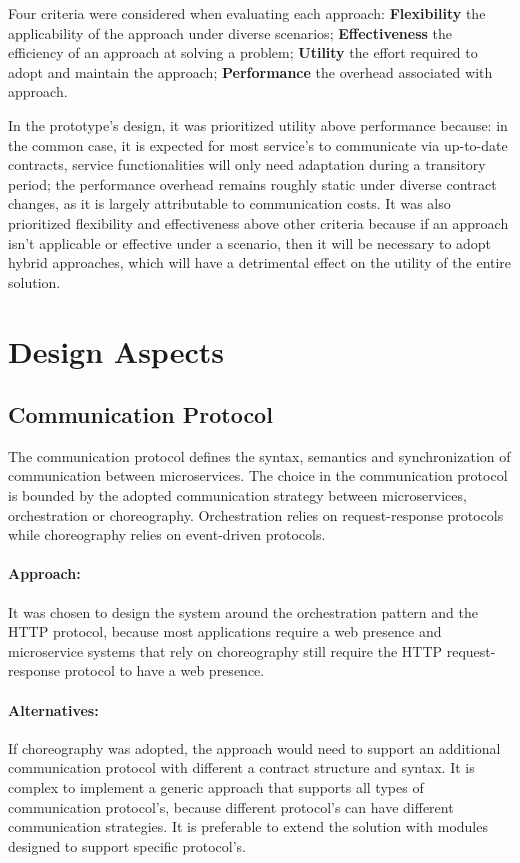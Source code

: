 Four criteria were considered when evaluating each approach:
\textbf{Flexibility} the applicability of the approach under diverse scenarios;
\textbf{Effectiveness} the efficiency of an approach at solving a problem;
\textbf{Utility} the effort required to adopt and maintain the approach;
\textbf{Performance} the overhead associated with approach.

In the prototype's design, it was prioritized utility above performance because:
in the common case, it is expected for most service's to communicate via up-to-date contracts, service functionalities will only need adaptation during a transitory period;
the performance overhead remains roughly static under diverse contract changes, as it is largely attributable to communication costs.
It was also prioritized flexibility and effectiveness above other criteria because if an approach isn't applicable or effective under a scenario,
then it will be necessary to adopt hybrid approaches, which will have a detrimental effect on the utility of the entire solution.

\section{Design Aspects} %
\label{sec:design_aspects}

\subsection{Communication Protocol} %
\label{sec:communication_protocol}

The communication protocol defines the syntax, semantics and synchronization of communication between microservices.
The choice in the communication protocol is bounded by the adopted communication strategy between microservices, orchestration or choreography.
Orchestration relies on request-response protocols while choreography relies on event-driven protocols.

\paragraph{Approach:}
It was chosen to design the system around the orchestration pattern and the HTTP protocol,
because most applications require a web presence and microservice systems that
rely on choreography still require the HTTP request-response protocol to have a web presence.

\paragraph{Alternatives:}
If choreography was adopted, the approach would need to support an additional communication protocol with different a contract structure and syntax.
It is complex to implement a generic approach that supports all types of communication protocol's, because different protocol's can have different communication strategies.
It is preferable to extend the solution with modules designed to support specific protocol's.

